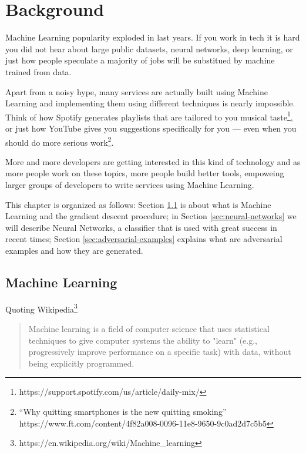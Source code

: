 \chapter{Background}
\label{ch:background}

Machine Learning popularity exploded in last years. If you work in tech
it is hard you did not hear about large public datasets, neural
networks, deep learning, or just how people speculate a majority of
jobs will be substitued by machine trained from data.

Apart from a noisy hype, many services are actually built using Machine
Learning and implementing them using different techniques is nearly
impossible. Think of how Spotify generates playlists that are tailored
to you musical
taste\footnote{https://support.spotify.com/us/article/daily-mix/}, or
just how YouTube gives you suggestions specifically for you
\cite{45530} --- even when you should do more serious
work\footnote{``Why quitting smartphones is the new quitting smoking'' https://www.ft.com/content/4f82a008-0096-11e8-9650-9c0ad2d7c5b5}.

More and more developers are getting interested in this kind of
technology and as more people work on these topics, more people build
better tools, empoweing larger groups of developers to write
services using Machine Learning.

This chapter is organized as follows: Section
\ref{sec:machine-learning} is about what is Machine Learning and the
gradient descent procedure; in Section \ref{sec:neural-networks} we will
describe Neural Networks, a classifier that is used with great success
in recent times; Section \ref{sec:adversarial-examples} explains what
are adversarial examples and how they are generated.

\section{Machine Learning}
\label{sec:machine-learning}

Quoting
Wikipedia\footnote{https://en.wikipedia.org/wiki/Machine\_learning}

\begin{quote}
Machine learning is a field of computer science that uses statistical
techniques to give computer systems the ability to "learn" (e.g.,
progressively improve performance on a specific task) with data,
without being explicitly programmed.
\end{quote}

